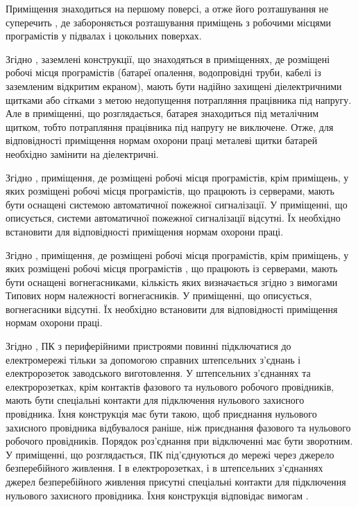 \documentclass[a4paper,12pt]{article}
\begin{document}
Приміщення знаходиться на першому поверсі, а отже його розташування не суперечить \cite{sanpin798}, де забороняється розташування приміщень з робочими місцями  програмістів у підвалах і цокольних поверхах.

Згідно \cite{npaop1210}, заземлені конструкції, що знаходяться в приміщеннях, де розміщені робочі місця програмістів (батареї опалення,  водопровідні труби, кабелі із заземленим відкритим екраном), мають бути надійно захищені діелектричними щитками або сітками  з  метою  недопущення потрапляння працівника під напругу. Але в приміщенні, що розглядається, батарея знаходиться під металічним щитком, тобто потрапляння працівника під напругу не виключене. Отже, для відповідності приміщення нормам охорони праці металеві щитки батарей необхідно замінити на діелектричні.

Згідно \cite{npaop1210}, приміщення, де розміщені робочі місця програмістів, крім приміщень, у яких розміщені робочі місця програмістів, що працюють із серверами, мають бути оснащені системою автоматичної пожежної сигналізації. У приміщенні, що описується, системи автоматичної пожежної сигналізації відсутні. Їх необхідно встановити для відповідності приміщення нормам охорони праці.

Згідно \cite{npaop1210}, приміщення, де розміщені робочі місця програмістів, крім приміщень, у яких розміщені робочі місця програмістів , що працюють із серверами, мають бути оснащені вогнегасниками, кількість яких визначається згідно з вимогами Типових норм належності вогнегасників. У приміщенні, що описується, вогнегасники відсутні. Їх необхідно встановити для відповідності приміщення нормам охорони праці.

Згідно \cite{npaop1210}, ПК з периферійними пристроями повинні підключатися до електромережі тільки за допомогою справних штепсельних з'єднань і електророзеток заводського виготовлення. У штепсельних з'єднаннях та електророзетках, крім контактів фазового та нульового робочого провідників, мають бути спеціальні контакти для підключення нульового захисного провідника. Їхня конструкція має бути такою, щоб приєднання нульового захисного провідника відбувалося раніше, ніж приєднання фазового та нульового робочого провідників. Порядок роз'єднання при відключенні має бути зворотним. У приміщенні, що розглядається, ПК під’єднуються до мережі через джерело безперебійного живлення. І в електророзетках, і в штепсельних з’єднаннях джерел безперебійного живлення присутні спеціальні контакти для підключення нульового захисного провідника. Їхня конструкція відповідає вимогам \cite{npaop1210}.
\end{document}

